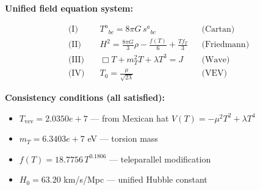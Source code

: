 
\textbf{Unified field equation system:}

\begin{align}
  \text{(I)} \quad & T^a{}_{bc} = 8\pi G \, s^a{}_{bc} && \text{(Cartan)} \\
  \text{(II)} \quad & H^2 = \frac{8\pi G}{3}\rho - \frac{f(T)}{6} + \frac{Tf_T}{3} && \text{(Friedmann)} \\
  \text{(III)} \quad & \Box T + m_T^2 T + \lambda T^3 = J && \text{(Wave)} \\
  \text{(IV)} \quad & T_0 = \frac{\mu}{\sqrt{2\lambda}} && \text{(VEV)}
\end{align}

\textbf{Consistency conditions (all satisfied):}
\begin{itemize}
  \item $T_{\text{vev}} = 2.0350e+7$ — from Mexican hat $V(T) = -\mu^2 T^2 + \lambda T^4$
  \item $m_T = 6.3403e+7$ eV — torsion mass
  \item $f(T) = 18.7756 \, T^{0.1806}$ — teleparallel modification
  \item $H_0 = 63.20$ km/s/Mpc — unified Hubble constant
\end{itemize}